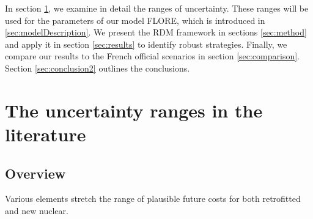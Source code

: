 In section \ref{sec:plausibleValues}, we examine in detail the ranges of uncertainty. These ranges will be used for the parameters of our model FLORE, which is introduced in \ref{sec:modelDescription}. We present the RDM framework in sections \ref{sec:method} and apply it in section \ref{sec:results} to identify robust strategies. Finally, we compare our results to the French official scenarios in section \ref{sec:comparison}. Section \ref{sec:conclusion2} outlines the conclusions.




\section{The uncertainty ranges in the literature}
\label{sec:plausibleValues}

\subsection{Overview}
Various elements stretch the range of plausible future costs for both retrofitted and new nuclear.

